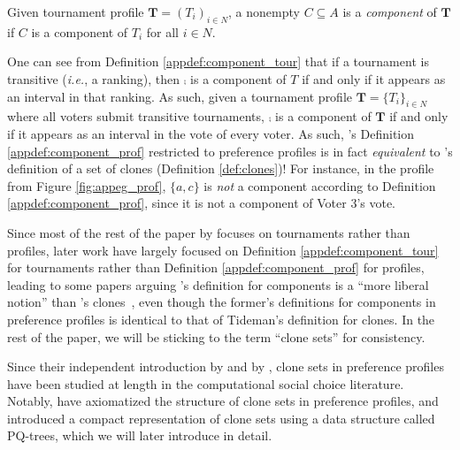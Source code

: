 \begin{definition}\label{appdef:component_prof}
Given tournament profile $\boldsymbol{T}=(T_i)_{i \in N}$, a nonempty $C \subseteq A$ is a \emph{component} of $\boldsymbol{T}$ if $C$ is a component of $T_i$ for all $i\in N$. 
\end{definition}

One can see from Definition \ref{appdef:component_tour} that if a tournament is transitive (\emph{i.e.}, a ranking), then $\comp$ is a component of $T$ if and only if it appears as an interval in that ranking. As such, given a tournament profile $\boldsymbol{T}=\{T_{i}\}_{i \in N}$ where all voters submit transitive tournaments, $\comp$ is a component of $\boldsymbol{T}$ if and only if it appears as an interval in the vote of every voter. As such, \citeauthor{Laffond96:Composition}'s Definition \ref{appdef:component_prof} restricted to preference profiles is in fact \emph{equivalent} to \citeauthor{Tideman87:Independence}'s definition of a set of clones (Definition \ref{def:clones})! For instance, in the profile from Figure \ref{fig:appeg_prof}, $\{a,c\}$ is \textit{not} a component according to Definition \ref{appdef:component_prof}, since it is not a component of Voter 3's vote. 

Since most of the rest of the paper by \citet{Laffond96:Composition} focuses on tournaments rather than profiles, later work have largely focused on Definition \ref{appdef:component_tour} for tournaments rather than Definition \ref{appdef:component_prof} for profiles, leading to some papers arguing \citeauthor{Laffond96:Composition}'s definition for components is a ``more liberal notion'' than \citeauthor{Tideman87:Independence}'s clones~\citep{Conitzer24:Position,Holliday24:Simple}, even though the former's definitions for components in preference profiles is identical to that of Tideman's definition for clones. In the rest of the paper, we will be sticking to the term ``clone sets'' for consistency. 

Since their independent introduction by \citeauthor{Tideman87:Independence} and by \citeauthor{Laffond96:Composition}, clone sets in preference profiles have been studied at length in the computational social choice literature. Notably, \citet{Elkind10:Clone} have axiomatized the  structure of clone sets in preference profiles, and introduced a compact representation of clone sets using a data structure called PQ-trees, which we will later introduce in detail.

